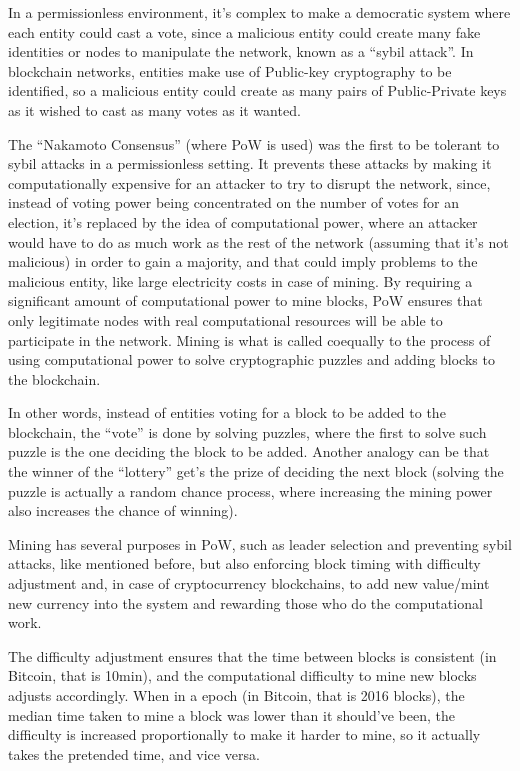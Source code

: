 In a permissionless environment, it's complex to make a democratic system where each entity could cast a vote, since a malicious entity could create many fake identities or nodes to manipulate the network, known as a ``sybil attack''.
In blockchain networks, entities make use of Public-key cryptography to be identified, so a malicious entity could create as many pairs of Public-Private keys as it wished to cast as many votes as it wanted.

The ``Nakamoto Consensus'' (where PoW is used) was the first to be tolerant to sybil attacks in a permissionless setting.
It prevents these attacks by making it computationally expensive for an attacker to try to disrupt the network, since, instead of voting power being concentrated on the number of votes for an election, it's replaced by the idea of computational power, where an attacker would have to do as much work as the rest of the network (assuming that it's not malicious) in order to gain a majority, and that could imply problems to the malicious entity, like large electricity costs in case of mining.
By requiring a significant amount of computational power to mine blocks, PoW ensures that only legitimate nodes with real computational resources will be able to participate in the network.
Mining is what is called coequally to the process of using computational power to solve cryptographic puzzles and adding blocks to the blockchain.

In other words, instead of entities voting for a block to be added to the blockchain, the ``vote'' is done by solving puzzles, where the first to solve such puzzle is the one deciding the block to be added. Another analogy can be that the winner of the ``lottery''  get's the prize of deciding the next block (solving the puzzle is actually a random chance process, where increasing the mining power also increases the chance of winning).

Mining has several purposes in PoW, such as leader selection and preventing sybil attacks, like mentioned before, but also enforcing block timing with difficulty adjustment and, in case of cryptocurrency blockchains, to add new value/mint new currency into the system and rewarding those who do the computational work. 

The difficulty adjustment ensures that the time between blocks is consistent (in Bitcoin, that is 10min), and the computational difficulty to mine new blocks adjusts accordingly. When in a epoch (in Bitcoin, that is 2016 blocks), the median time taken to mine a block was lower than it should've been, the difficulty is increased proportionally to make it harder to mine, so it actually takes the pretended time, and vice versa.

